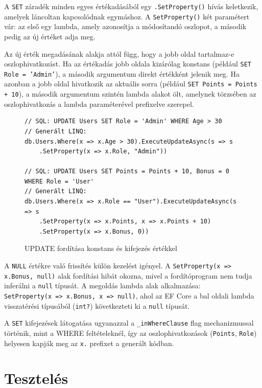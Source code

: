 \documentclass[a4paper,12pt]{article}
\begin{document}
A \texttt{SET} záradék minden egyes értékadásából egy \texttt{.SetProperty()} hívás keletkezik, amelyek láncoltan kapcsolódnak egymáshoz. A \texttt{SetProperty()} két paramétert vár: az első egy lambda, amely azonosítja a módosítandó oszlopot, a második pedig az új értéket adja meg.

Az új érték megadásának alakja attól függ, hogy a jobb oldal tartalmaz-e oszlophivatkozást. Ha az értékadás jobb oldala kizárólag konstans (például \texttt{SET Role = 'Admin'}), a második argumentum direkt értékként jelenik meg. Ha azonban a jobb oldal hivatkozik az aktuális sorra (például \texttt{SET Points = Points + 10}), a második argumentum szintén lambda alakot ölt, amelynek törzsében az oszlophivatkozás a lambda paraméterével prefixelve szerepel.

\begin{figure}[H]
\begin{lstlisting}
// SQL: UPDATE Users SET Role = 'Admin' WHERE Age > 30
// Generált LINQ:
db.Users.Where(x => x.Age > 30).ExecuteUpdateAsync(s => s
    .SetProperty(x => x.Role, "Admin"))

// SQL: UPDATE Users SET Points = Points + 10, Bonus = 0 WHERE Role = 'User'
// Generált LINQ:
db.Users.Where(x => x.Role == "User").ExecuteUpdateAsync(s => s
    .SetProperty(x => x.Points, x => x.Points + 10)
    .SetProperty(x => x.Bonus, 0))
\end{lstlisting}
\caption{UPDATE fordítása konstans és kifejezés értékkel}
\end{figure}

A \texttt{NULL} értékre való frissítés külön kezelést igényel. A \texttt{SetProperty(x => x.Bonus, null)} alak fordítási hibát okozna, mivel a fordítóprogram nem tudja inferálni a \texttt{null} típusát. A megoldás lambda alak alkalmazása: \\\texttt{SetProperty(x => x.Bonus, x => null)}, ahol az EF Core a bal oldali lambda visszatérési típusából (\texttt{int?}) következteti ki a \texttt{null} típusát.

A \texttt{SET} kifejezések látogatása ugyanazzal a \texttt{\_inWhereClause} flag mechanizmussal történik, mint a WHERE feltételeknél, így az oszlophivatkozások (\texttt{Points}, \texttt{Role}) helyesen kapják meg az \texttt{x.} prefixet a generált kódban.

\section{Tesztelés}
\end{document}
